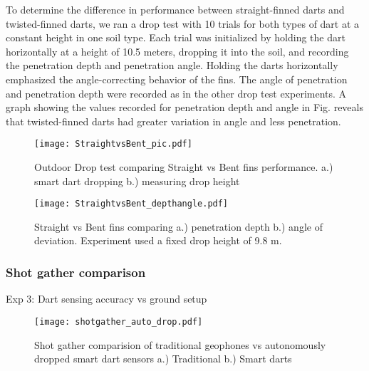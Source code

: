 To determine the difference in performance between straight-finned darts and twisted-finned darts, we ran a drop test with 10 trials for both types of dart at a constant height in one soil type. Each trial was initialized by holding the dart horizontally at a height of 10.5 meters, dropping it into the soil, and recording the penetration depth and penetration angle. Holding the darts horizontally emphasized the angle-correcting behavior of the fins. The angle of penetration and penetration depth were recorded as in the other drop test experiments. A graph showing the values recorded for penetration depth and angle in Fig. reveals that twisted-finned darts had greater variation in angle and less penetration.
\begin{figure} \centering
  {\texttt{[image: StraightvsBent\_pic.pdf]}}
 \caption{Outdoor Drop test comparing Straight vs Bent fins performance.
 a.)  smart dart dropping 
 b.)  measuring drop height} 
 \label{fig:StraightBentPic}
 \vspace{-1em}
\end{figure}
\begin{figure} \centering
  {\texttt{[image: StraightvsBent\_depthangle.pdf]}}
 \caption{\label{fig:StraightBentDepth}Straight vs Bent fins comparing a.) penetration depth b.) angle of deviation. Experiment used a fixed drop height of 9.8 m.} 
\end{figure}
\subsubsection{Shot gather comparison}
Exp 3: Dart sensing accuracy vs ground setup

\begin{figure} \centering
  {\texttt{[image: shotgather\_auto\_drop.pdf]}}
 \caption{Shot gather comparision of traditional geophones vs autonomously dropped smart dart sensors a.) Traditional b.) Smart darts} 
 \label{fig:TradvsAutoDrop}
\end{figure}


 